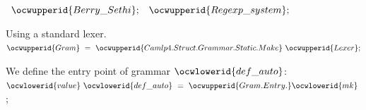 \documentclass[12pt]{article}
\begin{document}
\label{../ML/regular.ml:16812}%
\ocwindent{0.00em}
~$\ocwupperid{Berry\_Sethi};$\ocweol
\ocwindent{0.00em}
~$\ocwupperid{Regexp\_system};$\medskip

\ocwendcode{}\ocwindent{0.00em}
Using a standard lexer. 
\ocweol
\label{../ML/regular.ml:16881}%
\medskip
\ocwbegincode{}\ocwindent{0.00em}
~$\ocwupperid{Gram}~=~\ocwupperid{Camlp4.Struct.Grammar.Static.Make}~\ocwupperid{Lexer};$\medskip

\ocwendcode{}\ocwindent{0.00em}
We define the entry point of grammar \ocwbegindcode{}$\ocwlowerid{def\_auto}$\ocwenddcode{}: 
\ocweol
\label{../ML/regular.ml:16992}%
\medskip
\ocwbegincode{}\ocwindent{0.00em}
$\ocwlowerid{value}~\ocwlowerid{def\_auto}~=~\ocwupperid{Gram.Entry.}\ocwlowerid{mk}~$\ocweol
\ocwindent{0.00em}
;\medskip
\end{document}
